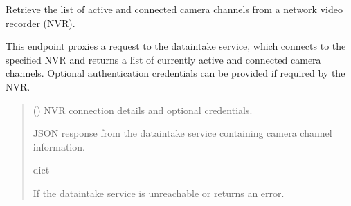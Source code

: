 \documentclass[letterpaper,10pt,english]{sphinxmanual}
\begin{document}
\begin{fulllineitems}
\label{\detokenize{modules/src.pig_sorting_api.main:src.pig_sorting_api.main.channels}}
\pysigstartsignatures
\pysiglinewithargsret
{}
{}
{}
\pysigstopsignatures
\sphinxAtStartPar
Retrieve the list of active and connected camera channels from a network video recorder (NVR).

\sphinxAtStartPar
This endpoint proxies a request to the data\sphinxhyphen{}intake service, which connects
to the specified NVR and returns a list of currently active and connected
camera channels. Optional authentication credentials can be provided if
required by the NVR.
\begin{quote}\begin{description}
\sphinxAtStartPar
{} ({\hyperref[\detokenize{modules/src.pig_sorting_api.main:src.pig_sorting_api.main.ChannelsRequest}]{}}) \textendash{} NVR connection details and optional credentials.

\sphinxAtStartPar
JSON response from the data\sphinxhyphen{}intake service containing camera
channel information.

\sphinxAtStartPar
dict

\sphinxAtStartPar
{} \textendash{} If the data\sphinxhyphen{}intake service is unreachable or returns an error.

\end{description}\end{quote}

\end{fulllineitems}

\end{document}
